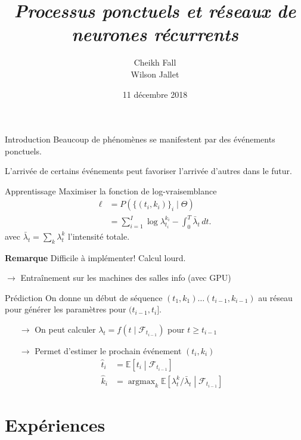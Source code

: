 \documentclass{beamer}
\title{
	\textit{Processus ponctuels et réseaux de neurones récurrents}
}
\author{Cheikh Fall\\Wilson Jallet}
\date{11 décembre 2018}
\newcommand{\EE}{\mathbb{E}}
\DeclareMathOperator*{\argmax}{argmax} %
\begin{document}
\maketitle

\begin{frame}{Introduction}
Beaucoup de phénomènes se manifestent par des événements ponctuels.\pause

L'arrivée de certains événements peut favoriser l'arrivée d'autres dans le futur.
\end{frame}



\begin{frame}{Apprentissage}
Maximiser la fonction de log-vraisemblance
\begin{equation}\label{eq:logLikelihood}
\begin{aligned}
\ell &= P\left( \{(t_i,k_i)\}_i \mid \Theta \right) \\
&= \sum_{i=1}^{I}\log \lambda^{k_i}_{t_i} - \int_0^T \bar{\lambda}_t\,dt.
\end{aligned}
\end{equation}
avec $\bar{\lambda}_t = \sum_k \lambda^k_t$ l'intensité totale.

\textbf{Remarque} Difficile à implémenter! Calcul lourd.

$\rightarrow$ Entraînement sur les machines des salles info (avec GPU)
\end{frame}

\begin{frame}{Prédiction}
On donne un début de séquence $(t_1,k_1)\ldots (t_{i-1}, k_{i-1})$ au réseau pour générer les paramètres pour $(t_{i-1}, t_i]$.
\begin{itemize}
	\item[$\rightarrow$] On peut calculer $\lambda_t = f(t\mid\mathcal{F}_{t_{i-1}})$ pour $t\geq t_{i-1}$
	\item[$\rightarrow$] Permet d'estimer le prochain événement $(t_i, k_i)$
	\[
	\begin{aligned}
		\hat{t}_i &= \EE\left[t_i \middle| \mathcal{F}_{t_{i-1}}\right] \\
		\hat{k}_i &= \argmax_{k}\EE\left[\lambda^k_t/\bar{\lambda}_t\middle| \mathcal{F}_{t_{i-1}} \right]
	\end{aligned}
	\]
\end{itemize}
\end{frame}

\section{Expériences}
\end{document}
